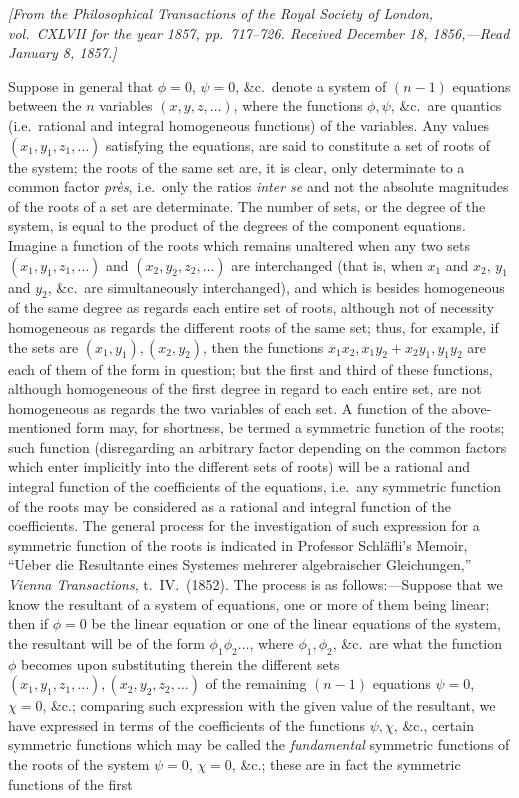\documentclass[11pt]{article}
\begin{document}
\noindent\textit{[From the Philosophical Transactions of the Royal Society of London, vol.~CXLVII for the year 1857, pp.~717--726. Received December 18, 1856,---Read January 8, 1857.]}

\medskip

\noindent Suppose in general that $\phi = 0$, $\psi = 0$, \&c.\ denote a system of $(n - 1)$ equations between the $n$ variables $(x, y, z, \ldots)$, where the functions $\phi, \psi$, \&c.\ are quantics (i.e.\ rational and integral homogeneous functions) of the variables. Any values $(x_1, y_1, z_1, \ldots)$ satisfying the equations, are said to constitute a set of roots of the system; the roots of the same set are, it is clear, only determinate to a common factor \emph{pr\`es}, i.e.\ only the ratios \emph{inter se} and not the absolute magnitudes of the roots of a set are determinate. The number of sets, or the degree of the system, is equal to the product of the degrees of the component equations. Imagine a function of the roots which remains unaltered when any two sets $(x_1, y_1, z_1, \ldots)$ and $(x_2, y_2, z_2, \ldots)$ are interchanged (that is, when $x_1$ and $x_2$, $y_1$ and $y_2$, \&c.\ are simultaneously interchanged), and which is besides homogeneous of the same degree as regards each entire set of roots, although not of necessity homogeneous as regards the different roots of the same set; thus, for example, if the sets are $(x_1, y_1), (x_2, y_2)$, then the functions $x_1 x_2, x_1 y_2 + x_2 y_1, y_1 y_2$ are each of them of the form in question; but the first and third of these functions, although homogeneous of the first degree in regard to each entire set, are not homogeneous as regards the two variables of each set. A function of the above-mentioned form may, for shortness, be termed a symmetric function of the roots; such function (disregarding an arbitrary factor depending on the common factors which enter implicitly into the different sets of roots) will be a rational and integral function of the coefficients of the equations, i.e.\ any symmetric function of the roots may be considered as a rational and integral function of the coefficients. The general process for the investigation of such expression for a symmetric function of the roots is indicated in Professor Schl\"afli's Memoir, ``Ueber die Resultante eines Systemes mehrerer algebraischer Gleichungen,'' \textit{Vienna Transactions}, t.~IV.\ (1852). The process is as follows:---Suppose that we know the resultant of a system of equations, one or more of them being linear; then if $\phi = 0$ be the linear equation or one of the linear equations of the system, the resultant will be of the form $\phi_1\phi_2\ldots$, where $\phi_1, \phi_2$, \&c.\ are what the function $\phi$ becomes upon substituting therein the different sets $(x_1, y_1, z_1, \ldots), (x_2, y_2, z_2, \ldots)$ of the remaining $(n - 1)$ equations $\psi = 0$, $\chi = 0$, \&c.; comparing such expression with the given value of the resultant, we have expressed in terms of the coefficients of the functions $\psi, \chi$, \&c., certain symmetric functions which may be called the \emph{fundamental} symmetric functions of the roots of the system $\psi = 0$, $\chi = 0$, \&c.; these are in fact the symmetric functions of the first 
\end{document}
